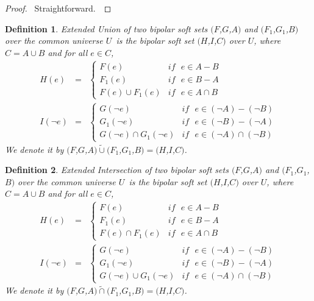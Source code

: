\documentclass{amsart}
\theoremstyle{plain}
\newtheorem{definition}{Definition}
\numberwithin{equation}{section}
\begin{document}
\begin{proof}
\ Straightforward.\ 
\end{proof}

\begin{definition}
\textit{Extended Union of two bipolar soft sets} $(F$,$G$,$A)$ and $(F_{1}$,$G_{1}$,$B)$ over the common universe $U$\ is the \textit{bipolar} soft set $(H$,$I$,$C)$ over $U$, where $C=A\cup B$ and for all $e\in C$,\begin{eqnarray*}
H(e) &=&\left\{ 
\begin{array}{cc}
F(e) & if\text{ }e\in A-B \\ 
F_{1}(e) & if\text{ }e\in B-A \\ 
F(e)\cup F_{1}(e) & if\text{ }e\in A\cap B\end{array}\right. \\
I(\lnot e) &=&\left\{ 
\begin{array}{cc}
G(\lnot e) & if\text{ }e\in (\lnot A)-(\lnot B) \\ 
G_{1}(\lnot e) & if\text{ }e\in (\lnot B)-(\lnot A) \\ 
G(\lnot e)\cap G_{1}(\lnot e) & if\text{ }e\in (\lnot A)\cap (\lnot B)\end{array}\right.
\end{eqnarray*}We denote it by $(F$,$G$,$A)\tilde{\cup}(F_{1}$,$G_{1}$,$B)=(H$,$I$,$C)$.
\end{definition}

\begin{definition}
\textit{Extended Intersection of two bipolar soft sets} $(F$,$G$,$A)$ and $(F_{1}$,$G_{1}$,$B)$ over the common universe $U$\ is the \textit{bipolar}
soft set $(H$,$I$,$C)$ over $U$, where $C=A\cup B$ and for all $e\in C$,\begin{eqnarray*}
H(e) &=&\left\{ 
\begin{array}{cc}
F(e) & if\text{ }e\in A-B \\ 
F_{1}(e) & if\text{ }e\in B-A \\ 
F(e)\cap F_{1}(e) & if\text{ }e\in A\cap B\end{array}\right. \\
I(\lnot e) &=&\left\{ 
\begin{array}{cc}
G(\lnot e) & if\text{ }e\in (\lnot A)-(\lnot B) \\ 
G_{1}(\lnot e) & if\text{ }e\in (\lnot B)-(\lnot A) \\ 
G(\lnot e)\cup G_{1}(\lnot e) & if\text{ }e\in (\lnot A)\cap (\lnot B)\end{array}\right.
\end{eqnarray*}We denote it by $(F$,$G$,$A)\tilde{\cap}(F_{1}$,$G_{1}$,$B)=(H$,$I$,$C)$.
\end{definition}
\end{document}
